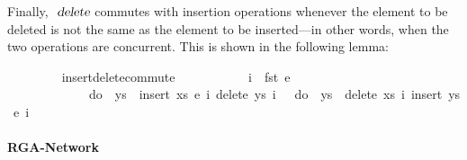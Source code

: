 \documentclass[acmlarge,review,anonymous]{acmart}\settopmatter{printfolios=true}
\begin{document}
\vspace{\baselineskip}
Finally, $\isa{delete}$ commutes with insertion operations whenever the element to be deleted is not the same as the element to be inserted---in other words, when the two operations are concurrent.
This is shown in the following lemma:
\\
\begin{isabellebody}
\ \ \ \ \ \ \ \  insert{\isacharunderscore}delete{\isacharunderscore}commute{\isacharcolon}\isanewline
\ \ \ \ \ \ \ \ \ \ \ {\isachardoublequoteopen}i{}\ {\isasymnoteq}\ fst\ e{\isachardoublequoteclose}\isanewline
\ \ \ \ \ \ \ \ \ \ \ \ \ {\isachardoublequoteopen}do\ {\isacharbraceleft}\ ys\ {\isasymleftarrow}\ insert\ xs\ e\ i{}{\isacharsemicolon}\ delete\ ys\ i{}\ {\isacharbraceright}\ {\isacharequal}\ do\ {\isacharbraceleft}\ ys\ {\isasymleftarrow}\ delete\ xs\ i{}{\isacharsemicolon}\ insert\ ys\ e\ i{}\ {\isacharbraceright}{\isachardoublequoteclose}
\end{isabellebody}

\paragraph{RGA-Network}
\end{document}
